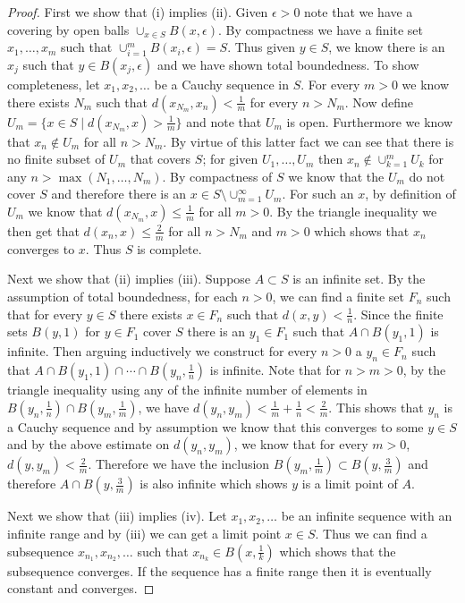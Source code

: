 \begin{proof}
First we show that (i) implies (ii).  Given $\epsilon > 0$ note that
we have a covering by open balls $\cup_{x \in S} B(x, \epsilon)$.  By
compactness we have a finite set $x_1, \dots, x_m$ such that
$\cup_{i=1}^m B(x_i, \epsilon) = S$.  Thus given $y \in S$, we know
there is an $x_j$ such that $y \in B(x_j, \epsilon)$ and we have shown
total boundedness.  To show completeness, let $x_1, x_2, \dots$ be a
Cauchy sequence in $S$.  For every $m > 0$ we know there exists $N_m$
such that $d(x_{N_m}, x_n) < \frac{1}{m}$ for every $n > N_m$.  Now
define $U_m = \lbrace x \in S \mid d(x_{N_m}, x) > \frac{1}{m}\rbrace$
and note that $U_m$ is open. Furthermore we know that $x_n \notin U_m$
for all $n > N_m$.  By virtue of this latter fact we can see that
there is no finite subset of $U_m$ that covers $S$; for given $U_1,
\dots, U_m$ then $x_n \notin \cup_{k=1}^m U_k$ for any $n > \max(N_1,
\dots, N_m)$.  By compactness of $S$ we know that the $U_m$ do not
cover $S$ and therefore there is an $x \in S \setminus
\cup_{m=1}^\infty U_m$.  For such an $x$, by definition of $U_m$ we
know that $d(x_{N_m}, x) \leq \frac{1}{m}$ for all $m > 0$.  By the
triangle inequality we then get that $d(x_n, x) \leq \frac{2}{m}$ for
all $n > N_m$ and $m > 0$ which shows that $x_n$ converges to $x$.
Thus $S$ is complete.

Next we show that (ii) implies (iii).  Suppose $A \subset S$ is an
infinite set.  By the assumption of total boundedness, for each $n >
0$, we can find a finite set $F_n$ such that for every $y \in S$ there
exists $x \in F_n$ such that $d(x,y) < \frac{1}{n}$.  Since the finite
sets $B(y, 1)$ for $y \in F_1$ cover $S$ there is an $y_1 \in F_1$
such that $A \cap B(y_1, 1)$ is infinite.  Then arguing inductively we
construct for every $n>0$ a $y_n \in F_n$ such that $A \cap B(y_1,1)
\cap \cdots \cap B(y_n, \frac{1}{n})$ is infinite.  Note that for $n > m
>0$, by the triangle inequality using any of the infinite number of
elements in $B(y_n, \frac{1}{n}) \cap B(y_m, \frac{1}{m})$, we have $d(y_n, y_m) < \frac{1}{m} +
\frac{1}{n} < \frac{2}{m}$.  This shows that $y_n$ is a Cauchy
sequence and by assumption we know that this converges to some $y \in
S$ and by the above estimate on $d(y_n, y_m)$, we know that for every
$m > 0$, $d(y, y_m) < \frac{2}{m}$.  Therefore we have the inclusion
$B(y_m, \frac{1}{m}) \subset B(y, \frac{3}{m})$ and therefore $A \cap
B(y, \frac{3}{m})$ is also infinite which shows $y$ is a limit point
of $A$.

Next we show that (iii) implies (iv).  Let $x_1, x_2, \dots$ be an
infinite sequence with an infinite range and by (iii) we can get a limit point $x \in S$.
Thus we can find a subsequence $x_{n_1}, x_{n_2}, \dots$ such that
$x_{n_k} \in B(x, \frac{1}{k})$ which shows that the subsequence
converges.  If the sequence has a finite range then it is eventually
constant and converges.


\end{proof}
